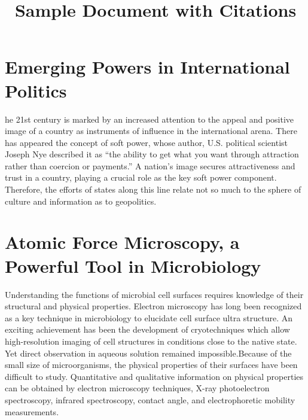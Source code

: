 \documentclass{article}
\begin{document}
\title{Sample Document with Citations}
\author{}
\date{}
\maketitle
\section{Emerging Powers in International Politics}
he 21st century is marked by an increased attention to the appeal and positive image of a
country as instruments of influence in the international arena\cite{bohomolov2012ghost}. There has
appeared the concept of soft power, whose author, U.S\cite{sergunin2015understanding}. political
scientist Joseph Nye described it as “the ability to get what you want through attraction rather than
coercion or payments\cite{hill2006moscow}.” A nation’s image secures attractiveness and trust in a
country, playing a crucial role as the key soft power component\cite{kiseleva2015russia}. Therefore,
the efforts of states along this line relate not so much to the sphere of culture and information as to
geopolitics\cite{kosachev2012spsecific}.
\section{Atomic Force Microscopy, a Powerful Tool in Microbiology}
Understanding the functions of microbial cell surfaces requires knowledge of their structural and
physical properties\cite{dufrene2002atomic}. Electron microscopy has long been recognized as a key
technique in microbiology to elucidate cell surface ultra structure\cite{engel1999atomic}. An exciting
achievement has been the development of cryotechniques which allow high-resolution imaging of
cell structures in conditions close to the native state\cite{franz2008atomic}. Yet direct observation in
aqueous solution remained impossible.Because of the small size of microorganisms, the physical
properties of their surfaces have been difficult to study\cite{marrese2017atomic}. Quantitative and
qualitative information on physical properties can be obtained by electron microscopy techniques,
X-ray photoelectron spectroscopy, infrared spectroscopy, contact angle, and electrophoretic mobility
measurements\cite{altman2015noncontact}.


\end{document}

